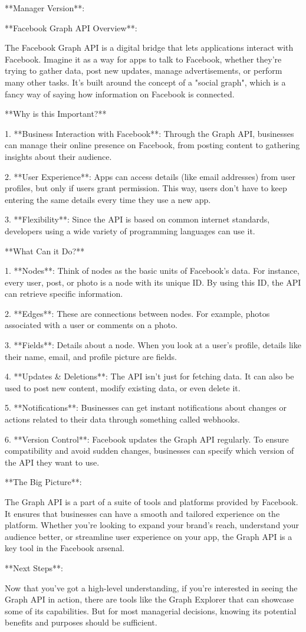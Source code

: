 **Manager Version**:

**Facebook Graph API Overview**:

The Facebook Graph API is a digital bridge that lets applications interact with Facebook. Imagine it as a way for apps to talk to Facebook, whether they’re trying to gather data, post new updates, manage advertisements, or perform many other tasks. It's built around the concept of a "social graph", which is a fancy way of saying how information on Facebook is connected.

**Why is this Important?**

1. **Business Interaction with Facebook**: Through the Graph API, businesses can manage their online presence on Facebook, from posting content to gathering insights about their audience.

2. **User Experience**: Apps can access details (like email addresses) from user profiles, but only if users grant permission. This way, users don’t have to keep entering the same details every time they use a new app.

3. **Flexibility**: Since the API is based on common internet standards, developers using a wide variety of programming languages can use it.

**What Can it Do?**

1. **Nodes**: Think of nodes as the basic units of Facebook's data. For instance, every user, post, or photo is a node with its unique ID. By using this ID, the API can retrieve specific information.

2. **Edges**: These are connections between nodes. For example, photos associated with a user or comments on a photo.

3. **Fields**: Details about a node. When you look at a user's profile, details like their name, email, and profile picture are fields.

4. **Updates & Deletions**: The API isn’t just for fetching data. It can also be used to post new content, modify existing data, or even delete it.

5. **Notifications**: Businesses can get instant notifications about changes or actions related to their data through something called webhooks.

6. **Version Control**: Facebook updates the Graph API regularly. To ensure compatibility and avoid sudden changes, businesses can specify which version of the API they want to use.

**The Big Picture**:

The Graph API is a part of a suite of tools and platforms provided by Facebook. It ensures that businesses can have a smooth and tailored experience on the platform. Whether you're looking to expand your brand's reach, understand your audience better, or streamline user experience on your app, the Graph API is a key tool in the Facebook arsenal.

**Next Steps**:

Now that you've got a high-level understanding, if you're interested in seeing the Graph API in action, there are tools like the Graph Explorer that can showcase some of its capabilities. But for most managerial decisions, knowing its potential benefits and purposes should be sufficient.